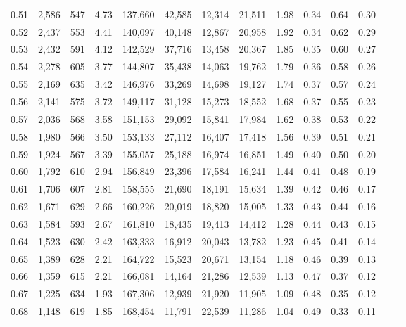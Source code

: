 \begin{tabular}{rrrrrrrrrrrrrr}
0.51 &  2,586 &  547 &    4.73 &  137,660 &   42,585 &  12,314 &  21,511 &  1.98 &  0.34 &  0.64 &      0.30 \\
0.52 &  2,437 &  553 &    4.41 &  140,097 &   40,148 &  12,867 &  20,958 &  1.92 &  0.34 &  0.62 &      0.29 \\
0.53 &  2,432 &  591 &    4.12 &  142,529 &   37,716 &  13,458 &  20,367 &  1.85 &  0.35 &  0.60 &      0.27 \\
0.54 &  2,278 &  605 &    3.77 &  144,807 &   35,438 &  14,063 &  19,762 &  1.79 &  0.36 &  0.58 &      0.26 \\
0.55 &  2,169 &  635 &    3.42 &  146,976 &   33,269 &  14,698 &  19,127 &  1.74 &  0.37 &  0.57 &      0.24 \\
0.56 &  2,141 &  575 &    3.72 &  149,117 &   31,128 &  15,273 &  18,552 &  1.68 &  0.37 &  0.55 &      0.23 \\
0.57 &  2,036 &  568 &    3.58 &  151,153 &   29,092 &  15,841 &  17,984 &  1.62 &  0.38 &  0.53 &      0.22 \\
0.58 &  1,980 &  566 &    3.50 &  153,133 &   27,112 &  16,407 &  17,418 &  1.56 &  0.39 &  0.51 &      0.21 \\
0.59 &  1,924 &  567 &    3.39 &  155,057 &   25,188 &  16,974 &  16,851 &  1.49 &  0.40 &  0.50 &      0.20 \\
0.60 &  1,792 &  610 &    2.94 &  156,849 &   23,396 &  17,584 &  16,241 &  1.44 &  0.41 &  0.48 &      0.19 \\
0.61 &  1,706 &  607 &    2.81 &  158,555 &   21,690 &  18,191 &  15,634 &  1.39 &  0.42 &  0.46 &      0.17 \\
0.62 &  1,671 &  629 &    2.66 &  160,226 &   20,019 &  18,820 &  15,005 &  1.33 &  0.43 &  0.44 &      0.16 \\
0.63 &  1,584 &  593 &    2.67 &  161,810 &   18,435 &  19,413 &  14,412 &  1.28 &  0.44 &  0.43 &      0.15 \\
0.64 &  1,523 &  630 &    2.42 &  163,333 &   16,912 &  20,043 &  13,782 &  1.23 &  0.45 &  0.41 &      0.14 \\
0.65 &  1,389 &  628 &    2.21 &  164,722 &   15,523 &  20,671 &  13,154 &  1.18 &  0.46 &  0.39 &      0.13 \\
0.66 &  1,359 &  615 &    2.21 &  166,081 &   14,164 &  21,286 &  12,539 &  1.13 &  0.47 &  0.37 &      0.12 \\
0.67 &  1,225 &  634 &    1.93 &  167,306 &   12,939 &  21,920 &  11,905 &  1.09 &  0.48 &  0.35 &      0.12 \\
0.68 &  1,148 &  619 &    1.85 &  168,454 &   11,791 &  22,539 &  11,286 &  1.04 &  0.49 &  0.33 &      0.11 \\

\end{tabular}
